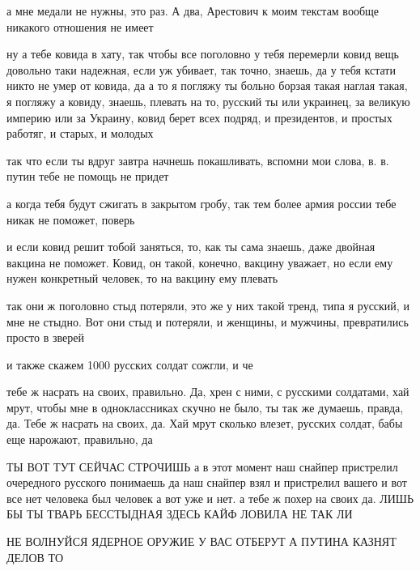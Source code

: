 а мне медали не нужны, это раз. А два, Арестович к моим текстам вообще никакого
отношения не имеет

ну а тебе ковида в хату, так чтобы все поголовно у тебя перемерли
ковид вещь довольно таки надежная, если уж убивает, так точно, знаешь, да
у тебя кстати никто не умер от ковида, да
а то я погляжу ты больно борзая такая
наглая такая, я погляжу
а ковиду, знаешь, плевать на то, русский ты или украинец, за великую империю или за Украину, ковид берет всех подряд, и президентов, и простых работяг, и старых, и молодых

так что если ты вдруг завтра начнешь покашливать, вспомни мои слова, в. в.
путин тебе не помощь не придет

а когда тебя будут сжигать в закрытом гробу, так тем более армия россии тебе
никак не поможет, поверь

и если ковид решит тобой заняться, то, как ты сама знаешь, даже двойная вакцина
не поможет. Ковид, он такой, конечно, вакцину уважает, но если ему нужен
конкретный человек, то на вакцину ему плевать

так они ж поголовно стыд потеряли, это же у них такой тренд, типа я русский, и
мне не стыдно. Вот они стыд и потеряли, и женщины, и мужчины, превратились
просто в зверей

и также скажем 1000 русских солдат сожгли, и че

тебе ж насрать на своих, правильно. Да, хрен с ними, с русскими солдатами, хай
мрут, чтобы мне в одноклассниках скучно не было, ты так же думаешь, правда, да.
Тебе ж насрать на своих, да. Хай мрут сколько влезет, русских солдат, бабы еще
нарожают, правильно, да

ТЫ ВОТ ТУТ СЕЙЧАС СТРОЧИШЬ а в этот момент наш снайпер пристрелил очередного
русского понимаешь да наш снайпер взял и пристрелил вашего и вот все нет
человека был человек а вот уже и нет. а тебе ж похер на своих да.  ЛИШЬ БЫ ТЫ
ТВАРЬ БЕССТЫДНАЯ ЗДЕСЬ КАЙФ ЛОВИЛА НЕ ТАК ЛИ

НЕ ВОЛНУЙСЯ ЯДЕРНОЕ ОРУЖИЕ У ВАС ОТБЕРУТ А ПУТИНА КАЗНЯТ ДЕЛОВ ТО


